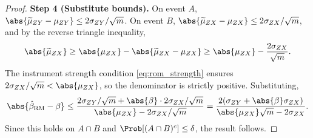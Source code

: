 \begin{proof}
\medskip\noindent\textbf{Step 4 (Substitute bounds).} On event $A$, $\abs{\widetilde{\mu}_{ZY} - \mu_{ZY}} \leq 2\sigma_{ZY}/\sqrt{m}$. On event $B$, $\abs{\widetilde{\mu}_{ZX} - \mu_{ZX}} \leq 2\sigma_{ZX}/\sqrt{m}$, and by the reverse triangle inequality,
\[
    \abs{\widetilde{\mu}_{ZX}} \geq \abs{\mu_{ZX}} - \abs{\widetilde{\mu}_{ZX} - \mu_{ZX}} \geq \abs{\mu_{ZX}} - \frac{2\sigma_{ZX}}{\sqrt{m}}.
\]
The instrument strength condition \eqref{eq:rom_strength} ensures $2\sigma_{ZX}/\sqrt{m} < \abs{\mu_{ZX}}$, so the denominator is strictly positive. Substituting,
\[
    \abs{\hat{\beta}_{\mathrm{RM}} - \beta} \leq \frac{2\sigma_{ZY}/\sqrt{m} + \abs{\beta}\cdot 2\sigma_{ZX}/\sqrt{m}}{\abs{\mu_{ZX}} - 2\sigma_{ZX}/\sqrt{m}} = \frac{2(\sigma_{ZY} + \abs{\beta}\sigma_{ZX})}{\abs{\mu_{ZX}}\sqrt{m} - 2\sigma_{ZX}}.
\]
Since this holds on $A \cap B$ and $\Prob[(A \cap B)^c] \leq \delta$, the result follows.
\end{proof}